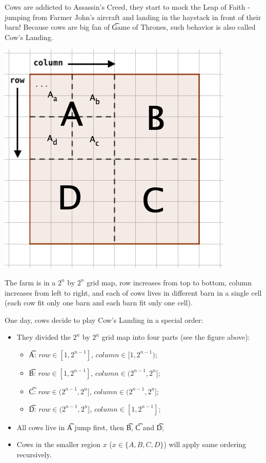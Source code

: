 Cows are addicted to Assassin's Creed, they start to mock the Leap of Faith -
jumping from Farmer John's aircraft and landing in the haystack in front of their barn!
Because cows are big fan of \t{Game of Thrones}, such behavior is also called Cow's Landing.

\begin{center}
  \includegraphics[scale=0.55]{quat.jpg}
\end{center}

The farm is in a $2^n$ by $2^n$ grid map, row increases from top to bottom,
column increases from left to right,
and each of cows lives in different barn in a single cell (each cow fit only one barn and each barn fit only one cell).

One day, cows decide to play Cow's Landing in a special order:

\begin{itemize}
  \item They divided the $2^n$ by $2^n$ grid map into four parts (see the figure above):

  \begin{itemize}
    \item \t{A}: $row \in [1, 2^{n-1}]$, $column \in [1, 2^{n-1})$;
    \item \t{B}: $row \in [1, 2^{n-1}]$, $column \in (2^{n-1}, 2^{n}]$;
    \item \t{C}: $row \in (2^{n-1}, 2^{n}]$, $column \in (2^{n-1}, 2^n]$;
    \item \t{D}: $row \in (2^{n-1}, 2^n]$, $column \in [1, 2^{n-1}]$;
  \end{itemize}

  \item All cows live in \t{A} jump first, then \t{B}, \t{C} and \t{D};
  \item Cows in the smaller region $x$ ($x \in \{A,B,C,D\}$) will apply same ordering recursively.
\end{itemize}

